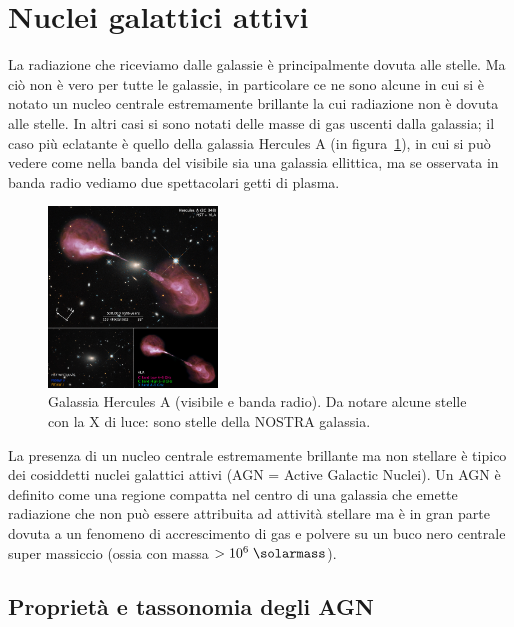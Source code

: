\section{Nuclei galattici attivi} \label{sec:nuclei-galattici-attivi}
La radiazione che riceviamo dalle galassie è principalmente dovuta alle stelle. Ma ciò non è vero per tutte le galassie, in particolare ce ne sono alcune in cui si è notato un nucleo centrale estremamente brillante la cui radiazione non è dovuta alle stelle. In altri casi si sono notati delle masse di gas uscenti dalla galassia; il caso più eclatante è quello della galassia Hercules A (in figura~\ref{fig:hercules-a}), in cui si può vedere come nella banda del visibile sia una galassia ellittica, ma se osservata in banda radio vediamo due spettacolari getti di plasma.

\begin{figure}
    \centering
    \includegraphics[width = 0.4\textwidth]{immagini/hercules-a.png}
    \caption{Galassia Hercules A (visibile e banda radio). Da notare alcune stelle con la X di luce: sono stelle della NOSTRA galassia.}
    \label{fig:hercules-a}
\end{figure}

La presenza di un nucleo centrale estremamente brillante ma non stellare è tipico dei cosiddetti nuclei galattici attivi (AGN = Active Galactic Nuclei). Un AGN è definito come una regione compatta nel centro di una galassia che emette radiazione che non può essere attribuita ad attività stellare ma è in gran parte dovuta a un fenomeno di accrescimento di gas e polvere su un buco nero centrale super massiccio (ossia con massa $> 10^6 \;\si{\solarmass}$). 

\subsection{Proprietà e tassonomia degli AGN}

